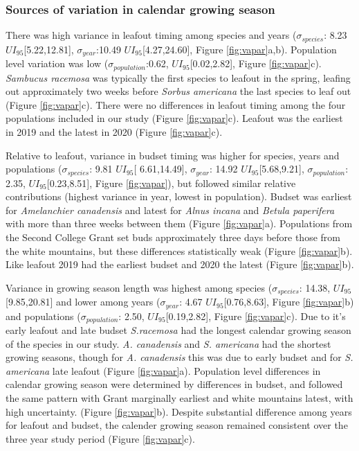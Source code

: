 \documentclass[12 pt]{article}
\begin{document}
\subsubsection{Sources of variation in calendar growing season}
There was high variance in leafout timing among species and years ($\sigma_{species}$: 8.23 $UI_{95}$[5.22,12.81], $\sigma_{year}$:10.49 $UI_{95}$[4.27,24.60], Figure \ref{fig:vapar}a,b). Population level variation was low ($\sigma_{population}$:0.62, $UI_{95}$[0.02,2.82], Figure \ref{fig:vapar}c). \emph{Sambucus racemosa} was typically the first species to leafout in the spring, leafing out approximately two weeks before \emph{Sorbus americana} the last species to leaf out (Figure \ref{fig:vapar}c). There were no differences in leafout timing among the four populations included in our study (Figure \ref{fig:vapar}c). Leafout was the earliest in 2019 and the latest in 2020 (Figure \ref{fig:vapar}c). 

Relative to leafout, variance in budset timing was higher for species, years and populations ($\sigma_{species}$: 9.81 $UI_{95}$[ 6.61,14.49], $\sigma_{year}$: 14.92 $UI_{95}$[5.68,9.21], $\sigma_{population}$: 2.35, $UI_{95}$[0.23,8.51], Figure \ref{fig:vapar}), but followed similar relative contributions (highest variance in year, lowest in population).
Budset was earliest for \emph{Amelanchier canadensis} and latest for \emph{Alnus incana} and \emph{Betula paperifera} with more than three weeks between them (Figure \ref{fig:vapar}a). Populations from the Second College Grant set buds approximately three days before those from the white mountains, but these differences statistically weak (Figure \ref{fig:vapar}b). Like leafout 2019 had the earliest budset and 2020 the latest (Figure \ref{fig:vapar}b).

Variance in growing season length was highest among species ($\sigma_{species}$: 14.38, $UI_{95}$[9.85,20.81] and lower among years ($\sigma_{year}$: 4.67 $UI_{95}$[0.76,8.63], Figure \ref{fig:vapar}b) and populations ($\sigma_{population}$: 2.50, $UI_{95}$[0.19,2.82], Figure \ref{fig:vapar}c). Due to it's early leafout and late budset \emph{S.racemosa} had the longest calendar growing season of the species in our study. \emph{A. canadensis} and \emph{S. americana} had the shortest growing seasons, though for \emph{A. canadensis} this was due to early budset and for \emph{S. americana} late leafout (Figure \ref{fig:vapar}a). Population level differences in calendar growing season were determined by differences in budset, and followed the same pattern with Grant marginally earliest and white mountains  latest, with high uncertainty. (Figure \ref{fig:vapar}b). Despite substantial difference among years for leafout and budset, the calender growing season remained consistent over the three year study period (Figure \ref{fig:vapar}c).
\end{document}
